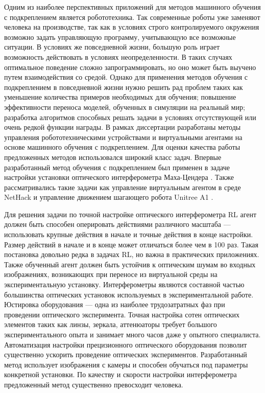 {\actuality} Одним из наиболее перспективных приложений для методов машинного обучения с подкреплением является робототехника. Так современные роботы уже заменяют человека на производстве, так как в условиях строго контролируемого окружения возможно задать управляющую программу, учитывающую все возможные ситуации. В условиях же повседневной жизни, большую роль играет возможность действовать в условиях неопределенности. В таких случаях оптимальное поведение сложно запрограммировать, но оно может быть выучено путем взаимодействия со средой. 
Однако для применения методов обучения с подкреплением в повседневной жизни нужно решить рад проблем таких как уменьшение количества примеров необходимых для обучения; повышение эффективности переноса моделей, обученных в симуляции на реальный мир; разработка алгоритмов способных решать задачи в условиях отсутствующей или очень редкой функции награды. В рамках диссертации разработаны методы управления робототехническими устройствами и виртуальными агентами на основе машинного обучения с подкреплением. Для оценки качества работы предложенных методов использовался широкий класс задач. Впервые разработанный метод обучения с подкреплением был применен в задаче настройки установки оптического интерферометра Маха-Цендера \cite{interferobot, v2}. Также рассматривались такие задачи как управление виртуальным агентом в среде NetHack \cite{nethack, raph} и управление движением шагающего робота Unitree A1 \cite{rl_unitree}. 

Для решения задачи по точной настройке оптического интерферометра RL агент должен быть способен оперировать действиями различного масштаба --- использовать крупные действия в начале и точные действия в конце настройки. Размер действий в начале и в конце может отличаться более чем в 100 раз. Такая постановка довольно редка в задачах RL, но важна в практических приложениях. Также обученный агент должен быть устойчив к оптическим шумам во входных изображениях, возникающих при переносе из виртуальной среды на экспериментальную установку. Интерферометры являются составной частью большинства оптических установок используемых в экспериментальной работе. Юстировка оборудования --- одна из наиболее трудозатратных фаз при проведении оптического эксперимента. Точная настройка сотен оптических элементов таких как линзы, зеркала, аттенюаторы требует большого экспериментального опыта и занимает много часов даже у опытного специалиста. Автоматизация настройки прецизионного оптического оборудования позволит существенно ускорить проведение оптических экспериментов. Разработанный метод использует изображения с камеры и способен обучаться под параметры конкретной установки. По качеству и скорости настройки интерферометра предложенный метод существенно превосходит человека. 

